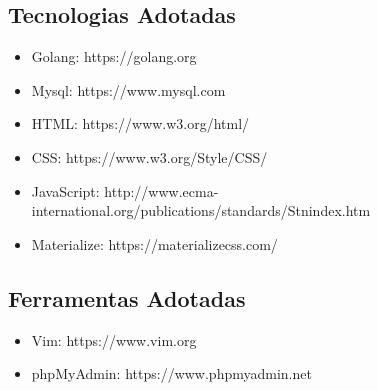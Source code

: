 \documentclass[12pt]{article}
\begin{document}
\begin{titlepage}
\subsection{Tecnologias Adotadas}

\begin{itemize}
	\item Golang: https://golang.org	
	\item Mysql: https://www.mysql.com
	\item HTML: https://www.w3.org/html/
	\item CSS: https://www.w3.org/Style/CSS/
	\item JavaScript: http://www.ecma-international.org/publications/standards/Stnindex.htm
	\item Materialize: https://materializecss.com/
\end{itemize}

\subsection{Ferramentas Adotadas}

\begin{itemize}
	\item Vim: https://www.vim.org
	\item phpMyAdmin: https://www.phpmyadmin.net
\end{itemize}

\newpage


\end{titlepage}
\end{document}
